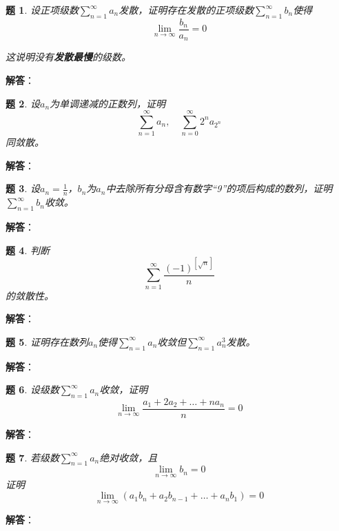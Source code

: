 \documentclass[a4paper,UTF8,fontset=windows,AutoFakeBold]{ctexart}
\newcommand*{\suminf}[1][n=1]{\sum_{#1}^\infty}
\newcommand*{\note}{\noindent *}
\theoremstyle{ex}
\newtheorem{exercise}{题}
\newcommand{\sol}[1]{{\vspace{5pt}\kaishu\noindent\textbf{解答}：\vspace{-3pt}
\begin{compactitem}
    \item[] #1
\end{compactitem}
}}
\begin{document}
\begin{framed}
\begin{exercise}
    设正项级数$\suminf a_n$发散，证明存在发散的正项级数$\suminf b_n$使得
    $$\lim_{n\to\infty}\frac{b_n}{a_n}=0$$

    \note 这说明没有\textbf{发散最慢}的级数。
\end{exercise}
\sol{

}
\end{framed}

\begin{framed}
\begin{exercise}
    设$a_n$为单调递减的正数列，证明
    $$\suminf a_n,\quad\suminf[n=0]2^na_{2^n}$$
    同敛散。
\end{exercise}
\sol{

}
\end{framed}

\begin{framed}
\begin{exercise}
    设$a_n=\frac{1}{n}$，$b_n$为$a_n$中去除所有分母含有数字``9''的项后构成的数列，证明$\suminf b_n$收敛。
\end{exercise}
\sol{

}
\end{framed}

\begin{framed}
\begin{exercise}
    判断
    $$\suminf\frac{(-1)^{[\sqrt{n}]}}{n}$$
    的敛散性。
\end{exercise}
\sol{

}
\end{framed}

\begin{framed}
\begin{exercise}
    证明存在数列$a_n$使得$\suminf a_n$收敛但$\suminf a_n^3$发散。
\end{exercise}
\sol{

}
\end{framed}

\begin{framed}
\begin{exercise}
    设级数$\suminf a_n$收敛，证明
    $$\lim_{n\to\infty}\frac{a_1+2a_2+\dots+na_n}{n}=0$$
\end{exercise}
\sol{

}
\end{framed}

\begin{framed}
\begin{exercise}
    若级数$\suminf a_n$绝对收敛，且
    $$\lim_{n\to\infty}b_n=0$$
    证明
    $$\lim_{n\to\infty}(a_1b_n+a_2b_{n-1}+\dots+a_nb_1)=0$$
\end{exercise}
\sol{

}
\end{framed}
\end{document}
